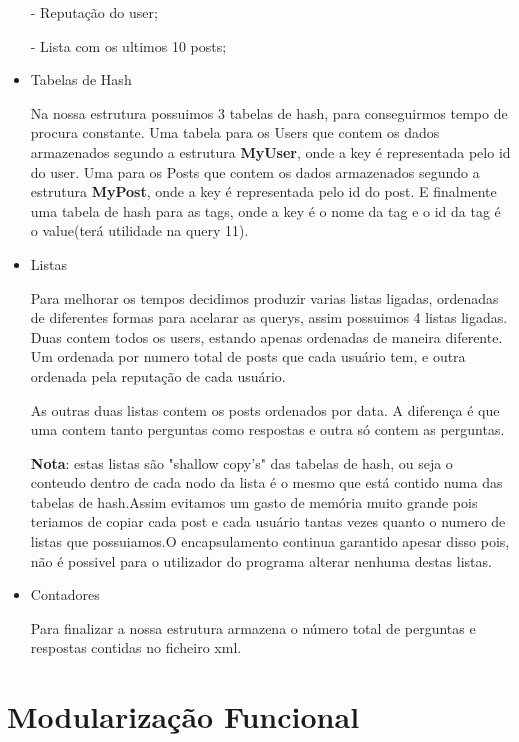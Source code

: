 \documentclass[a4paper,10pt]{article}
\begin{document}
\begin{itemize}
    \quad \quad - Reputa\c{c}\~{a}o do user;

    \quad \quad - Lista com os ultimos 10 posts;

    \item Tabelas de Hash

    \quad Na nossa estrutura possuimos 3 tabelas de hash, para conseguirmos tempo de procura constante. Uma tabela para os Users que contem os dados armazenados segundo a estrutura \textbf{MyUser}, onde a key \'e representada pelo id do user. Uma para os Posts que contem os dados armazenados segundo a estrutura \textbf{MyPost}, onde a key \'e representada pelo id do post. E finalmente uma tabela de hash para as tags, onde a key \'e o nome da tag e o id da tag \'e o value(ter\'a utilidade na query 11).

    \item Listas

    \quad Para melhorar os tempos decidimos produzir varias listas ligadas, ordenadas de diferentes formas para acelarar as querys, assim possuimos 4 listas ligadas. Duas contem todos os users, estando apenas ordenadas de maneira diferente. Um ordenada por numero total de posts que cada usu\'{a}rio tem, e outra ordenada pela reputa\c{c}\~{a}o de cada usu\'{a}rio.

    \quad As outras duas listas contem os posts ordenados por data. A diferen\c{c}a \'e que uma contem tanto perguntas como respostas e outra s\'{o} contem as perguntas.

    \quad \textbf{Nota}: estas listas s\~{a}o "shallow copy's" das tabelas de hash, ou seja o conteudo dentro de cada nodo da lista \'e o mesmo que est\'{a} contido numa das tabelas de hash.Assim evitamos um gasto de mem\'{o}ria muito grande pois teriamos de copiar cada post e cada usu\'{a}rio tantas vezes quanto o numero de listas que possuiamos.O encapsulamento continua garantido apesar disso pois, n\~{a}o \'e possivel para o utilizador do programa alterar nenhuma destas listas.

    \item Contadores

    \quad Para finalizar a nossa estrutura armazena o n\'{u}mero total de perguntas e respostas contidas no ficheiro xml.

    \end{itemize}
    

    \section {Modulariza\c{c}\~{a}o Funcional}
\end{document}
